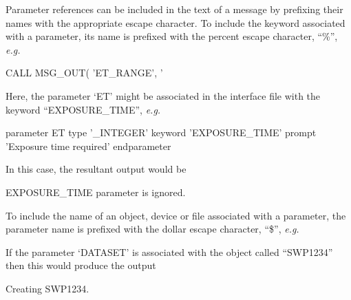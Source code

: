\documentclass[twoside,11pt]{starlink}
\begin{document}
Parameter references can be included in the text of a message by prefixing
their names with the appropriate escape character.
To include the keyword associated with a parameter, its name is prefixed with
the percent escape character, ``\%'', \textit{e.g.}

\begin {small}
\begin{terminalv}
CALL MSG_OUT( 'ET_RANGE', '%
\end{terminalv}
\end {small}

\begin {sloppypar}
Here, the parameter `ET' might be associated in the interface file
with the keyword ``EXPOSURE\_TIME'', \textit{e.g.}
\end {sloppypar}

\begin {small}
\begin{terminalv}
parameter ET
   type '_INTEGER'
   keyword 'EXPOSURE_TIME'
   prompt 'Exposure time required'
endparameter
\end{terminalv}
\end {small}

In this case, the resultant output would be

\begin {small}
\begin{terminalv}
EXPOSURE_TIME parameter is ignored.
\end{terminalv}
\end {small}

To include the name of an object, device or file associated with a parameter,
the parameter name is prefixed with the dollar escape character, ``\$'',
\textit{e.g.}

\begin {small}
\end {small}

If the parameter `DATASET' is associated with the object called ``SWP1234''
then this would produce the output

\begin {small}
\begin{terminalv}
Creating SWP1234.
\end{terminalv}
\end {small}
\end{document}
